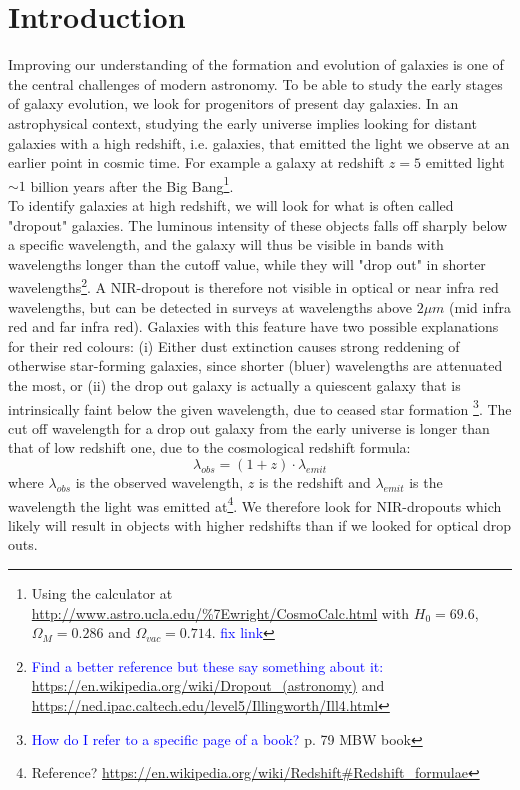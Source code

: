 \section{Introduction}
Improving our understanding of the formation and evolution of galaxies is one of the central challenges of modern astronomy. To be able to study the early stages of galaxy evolution, we look for progenitors of present day galaxies. In an astrophysical context, studying the early universe implies looking for distant galaxies with a high redshift, i.e. galaxies, that emitted the light we observe at an earlier point in cosmic time. For example a galaxy at redshift $z=5$ emitted light $\sim1$ billion years after the Big Bang\footnote{Using the calculator at \url{http://www.astro.ucla.edu/\%7Ewright/CosmoCalc.html} with $H_0=69.6$, $\Omega_M=0.286$ and $\Omega_{vac}=0.714$. \textcolor{blue}{fix link}}. \\

To identify galaxies at high redshift, we will look for what is often called "dropout" galaxies. The luminous intensity of these objects falls off sharply below a specific wavelength, and the galaxy will thus be visible in bands with wavelengths longer than the cutoff value, while they will "drop out" in shorter wavelengths\footnote{ \textcolor{blue}{Find a better reference but these say something about it:} \url{https://en.wikipedia.org/wiki/Dropout_(astronomy)} and \url{https://ned.ipac.caltech.edu/level5/Illingworth/Ill4.html}}.
A NIR-dropout is therefore not visible in optical or near infra red wavelengths, but can be detected in surveys at wavelengths above $2 \si{\mu m}$ (mid infra red and far infra red). Galaxies with this feature have two possible explanations for their red colours: (i) Either dust extinction causes strong reddening of otherwise star-forming galaxies, since shorter (bluer) wavelengths are attenuated the most, or (ii) the drop out galaxy is actually a quiescent galaxy that is intrinsically faint below the given wavelength, due to ceased star formation \footnote{\textcolor{blue}{How do I refer to a specific page of a book?} p. 79 MBW book }. The cut off wavelength for a drop out galaxy from the early universe is longer than that of low redshift one, due to the cosmological redshift formula:
\begin{equation}
    \lambda_{obs} = (1+z) \cdot \lambda_{emit}
\end{equation}
where $\lambda_{obs}$ is the observed wavelength, $z$ is the redshift and $\lambda_{emit}$ is the wavelength the light was emitted at\footnote{Reference? \url{https://en.wikipedia.org/wiki/Redshift#Redshift_formulae} }. We therefore look for NIR-dropouts which likely will result in objects with higher redshifts than if we looked for optical drop outs.\\

